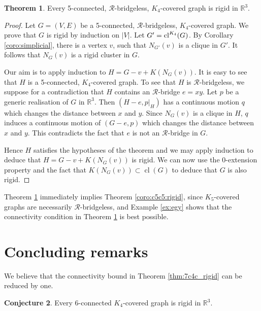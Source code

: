 \documentclass[11pt,a4paper]{article}
\theoremstyle{definition}
\newtheorem{theorem}{Theorem}[section]
\newtheorem{conjecture}[theorem]{Conjecture}
\DeclareMathOperator{\cl}{cl}
\newcommand{\cR}{\mathcal{R}}
\newcommand{\R}{\mathbb{R}}
\begin{document}
\begin{theorem}\label{thm:K4cyclic}
    Every 5-connected, $\cR$-bridgeless, $K_4$-covered graph 
    is rigid in $\R^3$.
\end{theorem}



\begin{proof}
    Let $G=(V,E)$ be a 5-connected, $\cR$-bridgeless, $K_4$-covered graph.
    We prove that $G$ is rigid by induction on $|V|$. Let $G'={\rm cl}^{K_4}(G)$. By Corollary \ref{coro:simplicial}, there is a vertex $v$, such that $N_{G'}(v)$ is a clique in $G'$. It follows that $N_G(v)$ is a rigid cluster in $G$. 
    
    Our aim is to apply induction to $H=G-v+K(N_G(v))$. It is easy to see that $H$ is a 5-connected, $K_4$-covered graph. 
    To see that  $H$ is $\cR$-bridgeless, we suppose for a contradiction that $H$ contains an $\cR$-bridge $e=xy$. Let $p$ be a generic realisation of  $G$ in $\R^3$. Then $(H-e,p|_H)$ has a continuous motion $q$ which changes the distance between $x$ and $y$.   
    Since $N_G(v)$ is a clique in $H$, $q$ induces a continuous motion of $(G-e,p)$ which changes  the distance between $x$ and $y$. This contradicts the fact that $e$ is not an $\cR$-bridge in $G$.
    
    Hence $H$ satisfies the hypotheses of the theorem and we may apply induction to deduce that $H=G-v+K(N_G(v))$ is rigid. We can now use the 0-extension property and the fact that $K(N_G(v))\subset \cl(G)$ to deduce that $G$ is also rigid. 
\end{proof}



 Theorem \ref{thm:K4cyclic} immediately implies Theorem \ref{coro:c5c5:rigid}, since $K_5$-covered graphs are necessarily $\cR$-bridgeless, and Example \ref{ex:egy} shows that the connectivity condition in Theorem \ref{thm:K4cyclic} is best possible.




\section{Concluding remarks}

We believe that the connectivity bound in Theorem  \ref{thm:7c4c_rigid} can be reduced by one. 

\begin{conjecture}
\label{con:zeo}
Every $6$-connected $K_4$-covered graph is rigid in $\R^3$. 
\end{conjecture}
\end{document}
